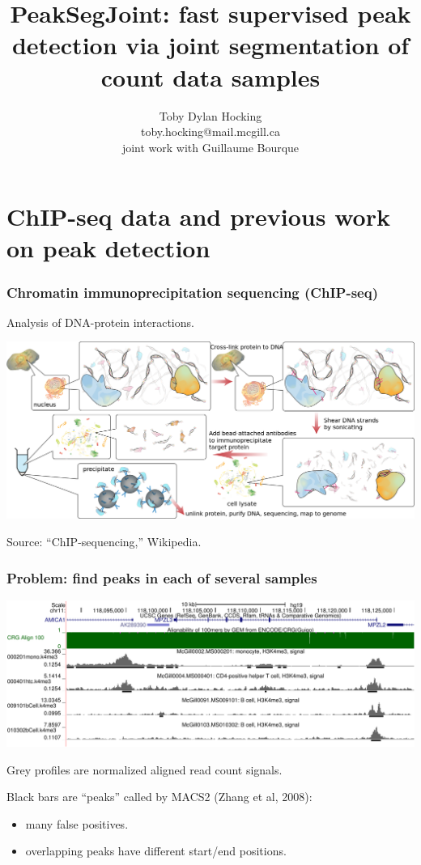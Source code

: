 \documentclass{beamer}
\begin{document}
\title{PeakSegJoint: fast supervised peak detection via joint
  segmentation of count data samples}

\author{
  Toby Dylan Hocking\\
  toby.hocking@mail.mcgill.ca\\
  joint work with Guillaume Bourque}


\maketitle

\section{ChIP-seq data and previous work on peak detection}


\begin{frame}
  \frametitle{Chromatin immunoprecipitation sequencing (ChIP-seq)}
  Analysis of DNA-protein interactions.

  \includegraphics[width=\textwidth]{Chromatin_immunoprecipitation_sequencing_wide.png}

  Source: ``ChIP-sequencing,'' Wikipedia.
\end{frame}

\begin{frame}
  \frametitle{Problem: find peaks in each of several samples}
  \includegraphics[width=\textwidth]{screenshot-ucsc-edited}

  Grey profiles are normalized aligned read count signals.

  Black bars are ``peaks'' called by MACS2 (Zhang et al, 2008):
  \begin{itemize}
  \item many false positives.
  \item overlapping peaks have different start/end positions.
  \end{itemize}
\end{frame}
\end{document}
